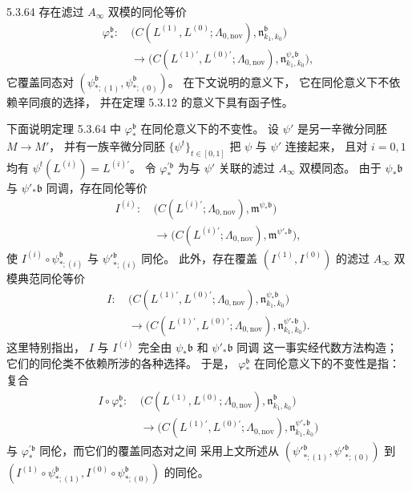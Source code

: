 \begin{theorem}{5.3.64}\label{thm:5-3-64}
存在滤过 $A_\infty$ 双模的同伦等价
\[
\begin{aligned}
\varphi_*^{\mathfrak b}\colon\
&\bigl(
C(L^{(1)},L^{(0)};\Lambda_{0,\mathrm{nov}}),
\mathfrak n^{\mathfrak b}_{k_1,k_0}
\bigr)\\
&\longrightarrow
\bigl(
C(L^{(1)\prime},L^{(0)\prime};
\Lambda_{0,\mathrm{nov}}),
\mathfrak n^{\psi_*\mathfrak b}_{k_1,k_0}
\bigr),
\end{aligned}
\]
它覆盖同态对
$(\psi^{\mathfrak b}_{*;(1)},
\psi^{\mathfrak b}_{*;(0)})$。
在下文说明的意义下，
它在同伦意义下不依赖辛同痕的选择，
并在定理 5.3.12 的意义下具有函子性。
\end{theorem}

下面说明定理 5.3.64 中
$\varphi_*^{\mathfrak b}$
在同伦意义下的不变性。
设 $\psi'$ 是另一辛微分同胚
$M\to M'$，
并有一族辛微分同胚
$\{\psi^t\}_{t\in[0,1]}$
把 $\psi$ 与 $\psi'$ 连接起来，
且对 $i=0,1$ 均有
$\psi^t(L^{(i)})=L^{(i)\prime}$。
令
$\varphi_*^{\prime\mathfrak b}$
为与 $\psi'$ 关联的滤过
$A_\infty$ 双模同态。
由于
$\psi_*\mathfrak b$
与 $\psi'_*\mathfrak b$
同调，存在同伦等价
\[
\begin{aligned}
I^{(i)}\colon\
&\bigl(
C(L^{(i)\prime};\Lambda_{0,\mathrm{nov}}),
\mathfrak m^{\psi_*\mathfrak b}
\bigr)\\
&\longrightarrow
\bigl(
C(L^{(i)\prime};\Lambda_{0,\mathrm{nov}}),
\mathfrak m^{\psi'_*\mathfrak b}
\bigr),
\end{aligned}
\]
使
$I^{(i)}\circ\psi^{\mathfrak b}_{*;(i)}$
与
$\psi'{}^{\mathfrak b}_{*;(i)}$
同伦。
此外，存在覆盖
$(I^{(1)},I^{(0)})$
的滤过 $A_\infty$ 双模典范同伦等价
\[
\begin{aligned}
I\colon\
&\bigl(
C(L^{(1)\prime},L^{(0)\prime};
\Lambda_{0,\mathrm{nov}}),
\mathfrak n_{k_1,k_0}^{\psi_*\mathfrak b}
\bigr)\\
&\longrightarrow
\bigl(
C(L^{(1)\prime},L^{(0)\prime};
\Lambda_{0,\mathrm{nov}}),
\mathfrak n_{k_1,k_0}^{\psi'_*\mathfrak b}
\bigr).
\end{aligned}
\]
这里特别指出，
$I$ 与 $I^{(i)}$
完全由
$\psi_*\mathfrak b$
和 $\psi'_*\mathfrak b$ 同调
这一事实经代数方法构造；
它们的同伦类不依赖所涉的各种选择。
于是，
$\varphi_*^{\mathfrak b}$
在同伦意义下的不变性是指：
复合
\[
\begin{aligned}
I\circ\varphi_*^{\mathfrak b}\colon\
&\bigl(
C(L^{(1)},L^{(0)};\Lambda_{0,\mathrm{nov}}),
\mathfrak n^{\mathfrak b}_{k_1,k_0}
\bigr)\\
&\longrightarrow
\bigl(
C(L^{(1)\prime},L^{(0)\prime};
\Lambda_{0,\mathrm{nov}}),
\mathfrak n^{\psi'_*\mathfrak b}_{k_1,k_0}
\bigr)
\end{aligned}
\]
与 $\varphi_*^{\prime\mathfrak b}$
同伦，而它们的覆盖同态对之间
采用上文所述从
$(\psi'{}^{\mathfrak b}_{*;(1)},
\psi'{}^{\mathfrak b}_{*;(0)})$
到
$(I^{(1)}\circ\psi^{\mathfrak b}_{*;(1)},
I^{(0)}\circ\psi^{\mathfrak b}_{*;(0)})$
的同伦。

